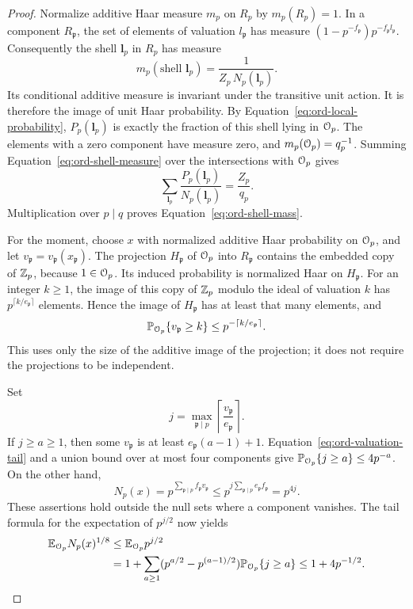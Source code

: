 \begin{proof}
Normalize additive Haar measure \(m_p\) on \(R_p\) by \(m_p(R_p)=1\).
In a component \(R_{\mathfrak p}\), the set of elements of valuation
\(l_{\mathfrak p}\) has measure
\((1-p^{-f_{\mathfrak p}})p^{-f_{\mathfrak p}l_{\mathfrak p}}\).
Consequently the shell \(\boldsymbol l_p\) in \(R_p\) has measure
\begin{equation}\label{eq:ord-shell-measure}
 m_p(\text{shell }\boldsymbol l_p)
       =\frac1{Z_p\,N_p(\boldsymbol l_p)}.
\end{equation}
Its conditional additive measure is invariant under the transitive
unit action.  It is therefore the image of unit Haar probability.
By Equation~\eqref{eq:ord-local-probability},
\(P_p(\boldsymbol l_p)\) is exactly the fraction of this shell lying
in \(\mathcal O_p\).  The elements with a zero component have measure zero,
and \(m_p(\mathcal O_p)=q_p^{-1}\).  Summing
Equation~\eqref{eq:ord-shell-measure} over the intersections with
\(\mathcal O_p\) gives
\[
 \sum_{\boldsymbol l_p}
       \frac{P_p(\boldsymbol l_p)}{N_p(\boldsymbol l_p)}
       =\frac{Z_p}{q_p}.
\]
Multiplication over \(p\mid q\) proves
Equation~\eqref{eq:ord-shell-mass}.

For the moment, choose \(x\) with normalized additive Haar probability
on \(\mathcal O_p\), and let \(v_{\mathfrak p}=v_{\mathfrak p}(x_{\mathfrak p})\).
The projection \(H_{\mathfrak p}\) of \(\mathcal O_p\) into
\(R_{\mathfrak p}\) contains the embedded copy of \(\mathbb Z_p\), because
\(1\in\mathcal O_p\).  Its induced probability is normalized Haar on
\(H_{\mathfrak p}\).  For an integer \(k\ge1\), the image of this
copy of \(\mathbb Z_p\) modulo the ideal of valuation \(k\) has
\(p^{\lceil k/e_{\mathfrak p}\rceil}\) elements.  Hence the image of
\(H_{\mathfrak p}\) has at least that many elements, and
\begin{equation}\label{eq:ord-valuation-tail}
 \mathbb P_{\mathcal O_p}\{v_{\mathfrak p}\ge k\}
       \le p^{-\lceil k/e_{\mathfrak p}\rceil}.
\end{equation}
This uses only the size of the additive image of the projection; it
does not require the projections to be independent.

Set
\[
 j=\max_{\mathfrak p\mid p}
              \left\lceil\frac{v_{\mathfrak p}}{e_{\mathfrak p}}\right\rceil.
\]
If \(j\ge a\ge1\), then some \(v_{\mathfrak p}\) is at least
\(e_{\mathfrak p}(a-1)+1\).  Equation~\eqref{eq:ord-valuation-tail}
and a union bound over at most four components give
\(\mathbb P_{\mathcal O_p}\{j\ge a\}\le4p^{-a}\).  On the other hand,
\[
 N_p(x)=p^{\sum_{\mathfrak p\mid p}f_{\mathfrak p}v_{\mathfrak p}}
       \le p^{j\sum_{\mathfrak p\mid p}e_{\mathfrak p}f_{\mathfrak p}}
       =p^{4j}.
\]
These assertions hold outside the null sets where a component vanishes.
The tail formula for the expectation of \(p^{j/2}\) now yields
\begin{align}
 \mathbb E_{\mathcal O_p}N_p(x)^{1/8}
 &\le \mathbb E_{\mathcal O_p}p^{j/2} \notag\\
 &=1+\sum_{a\ge1}
       (p^{a/2}-p^{(a-1)/2})\mathbb P_{\mathcal O_p}\{j\ge a\}
 \le 1+4p^{-1/2}.
 \label{eq:ord-local-moment}
\end{align}


\end{proof}
